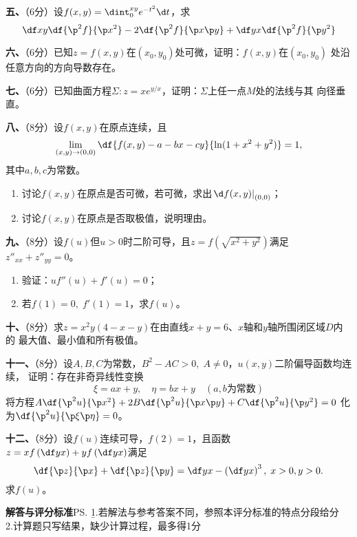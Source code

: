 \bigskip

{\bf 五、}（6分）设$f(x,y)=\dint_0^{xy}e^{-t^2}\d t$，求
$$\df xy\df{\p^2f}{\p x^2}
-2\df{\p^2f}{\p x\p y}+\df yx\df{\p^2f}{\p y^2}$$

\bigskip

{\bf 六、}（6分）已知$z=f(x,y)$在$(x_0,y_0)$处可微，证明：$f(x,y)$在$(x_0,y_0)$
处沿任意方向的方向导数存在。

\bigskip

{\bf 七、}（6分）已知曲面方程$\Sigma:z=xe^{y/x}$，证明：$\Sigma$上任一点$M$处的法线与其
向径垂直。

\bigskip

{\bf 八、}（8分）设$f(x,y)$在原点连续，且
$$\lim\limits_{(x,y)\to(0,0)}\df{f(x,y)-a-bx-cy}{\ln(1+x^2+y^2)}=1,$$
其中$a,b,c$为常数。
\begin{enumerate}[(1)]
  \setlength{\itemindent}{1cm}
  \item 讨论$f(x,y)$在原点是否可微，若可微，求出$\left.\d f(x,y)\right|_{(0,0)}$；
  \item 讨论$f(x,y)$在原点是否取极值，说明理由。
\end{enumerate}

\bigskip

{\bf 九、}（8分）设$f(u)$但$u>0$时二阶可导，且$z=f(\sqrt{x^2+y^2})$满足
$z''_{xx}+z''_{yy}=0$。
\begin{enumerate}[(1)]
  \setlength{\itemindent}{1cm}
  \item 验证：$uf''(u)+f'(u)=0$；
  \item 若$f(1)=0,\;f'(1)=1$，求$f(u)$。
\end{enumerate}

\bigskip

{\bf 十、}（8分）求$z=x^2y(4-x-y)$在由直线$x+y=6$、$x$轴和$y$轴所围闭区域$D$内的
最大值、最小值和所有极值。

\bigskip

{\bf 十一、}（8分）设$A,B,C$为常数，$B^2-AC>0,\;A\ne 0$，$u(x,y)$二阶偏导函数均连续，
证明：存在非奇异线性变换
$$\xi=ax+y,\quad \eta=bx+y\quad(a,b\mbox{为常数})$$
将方程$A\df{\p^2 u}{\p x^2}+2B\df{\p^2 u}{\p x\p y}+C\df{\p^2 u}{\p y^2}=0$
化为$\df{\p^2u}{\p\xi\p\eta}=0$。

\bigskip

{\bf 十二、}（8分）设$f(u)$连续可导，$f(2)=1$，且函数$z=xf\left(\df yx\right)
+yf\left(\df yx\right)$满足
$$\df{\p z}{\p x}+\df{\p z}{\p y}=\df yx-\left(\df yx\right)^3,\;x>0,y>0.$$
求$f(u)$。

\newpage

\begin{center}
	{\Large\bf 解答与评分标准}\ps{\b 
	1.若解法与参考答案不同，参照本评分标准的特点分段给分\\
	2.计算题只写结果，缺少计算过程，最多得1分}
\end{center}

